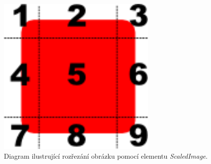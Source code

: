 \documentclass[11pt,twoside,a4paper]{book}
\begin{document}
{{\begin{ttemize}
{{\begin{lastlisting}[frame=single,caption=Řešení v pseudokódu problematického použití operátoru "." v přiřazovacím výroku,label=lst:var0N]
\begin{figure}[!ht]
\begin{center}
  \includegraphics[width=0.7\textwidth]{imgCut}
\caption{{\label{fig:cut}}Diagram ilustrující rozřezání obrázku pomocí elementu \textit{ScaledImage}.}
\end{center}
\end{figure}




\end{lastlisting}}}
\end{ttemize}}}
\end{document}
